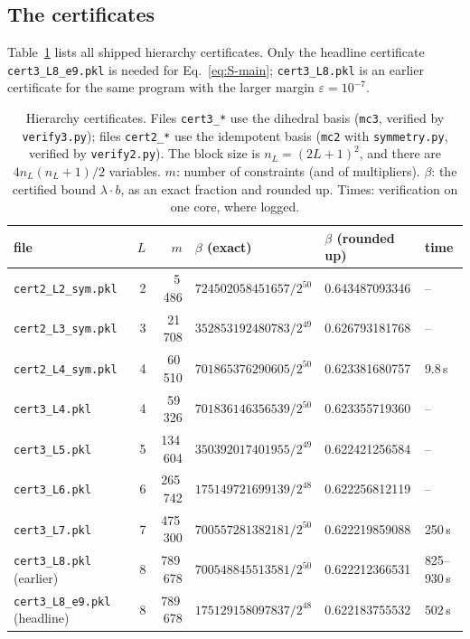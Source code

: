 \documentclass[aps,pra,onecolumn,notitlepage,superscriptaddress,longbibliography,nofootinbib,11pt]{revtex4-2}
\theoremstyle{remark}
\newcommand{\file}[1]{\texttt{#1}}
\begin{document}
\subsection{The certificates}

Table~\ref{tab:S-certs} lists all shipped hierarchy certificates. Only the headline certificate \file{cert3\_L8\_e9.pkl} is needed for Eq.~\eqref{eq:S-main}; \file{cert3\_L8.pkl} is an earlier certificate for the same program with the larger margin $\varepsilon=10^{-7}$.

\begin{table}[h]
\caption{Hierarchy certificates. Files \file{cert3\_*} use the dihedral basis (\file{mc3}, verified by \file{verify3.py}); files \file{cert2\_*} use the idempotent basis (\file{mc2} with \file{symmetry.py}, verified by \file{verify2.py}). The block size is $n_L=(2L+1)^2$, and there are $4n_L(n_L+1)/2$ variables. $m$: number of constraints (and of multipliers). $\beta$: the certified bound $\lambda\cdot b$, as an exact fraction and rounded up. Times: verification on one core, where logged.}
\label{tab:S-certs}
\footnotesize
\begin{ruledtabular}
\begin{tabular}{lrrlll}
file & $L$ & $m$ & $\beta$ (exact) & $\beta$ (rounded up) & time\\
\hline
\file{cert2\_L2\_sym.pkl} & 2 & 5\,486    & $724502058451657/2^{50}$ & 0.643487093346 & --\\
\file{cert2\_L3\_sym.pkl} & 3 & 21\,708   & $352853192480783/2^{49}$ & 0.626793181768 & --\\
\file{cert2\_L4\_sym.pkl} & 4 & 60\,510   & $701865376290605/2^{50}$ & 0.623381680757 & 9.8\,s\\
\file{cert3\_L4.pkl}      & 4 & 59\,326   & $701836146356539/2^{50}$ & 0.623355719360 & --\\
\file{cert3\_L5.pkl}      & 5 & 134\,604  & $350392017401955/2^{49}$ & 0.622421256584 & --\\
\file{cert3\_L6.pkl}      & 6 & 265\,742  & $175149721699139/2^{48}$ & 0.622256812119 & --\\
\file{cert3\_L7.pkl}      & 7 & 475\,300  & $700557281382181/2^{50}$ & 0.622219859088 & 250\,s\\
\file{cert3\_L8.pkl} (earlier) & 8 & 789\,678  & $700548845513581/2^{50}$ & 0.622212366531 & 825--930\,s\\
\file{cert3\_L8\_e9.pkl} (headline) & 8 & 789\,678  & $175129158097837/2^{48}$ & 0.622183755532 & 502\,s\\
\end{tabular}
\end{ruledtabular}
\end{table}
\end{document}
